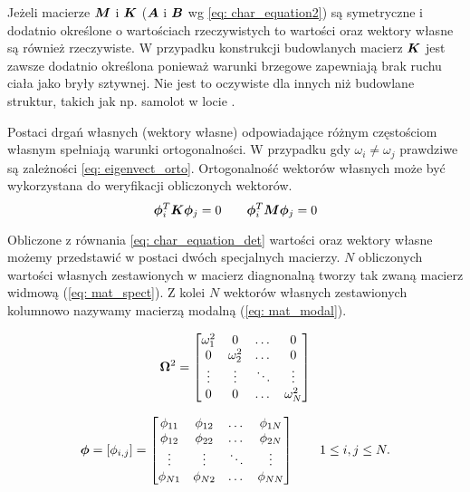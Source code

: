 Jeżeli macierze $\bm{M}$ i $\bm{K}$ ($\bm{A}$ i $\bm{B}$ wg \ref{eq: char_equation2}) są symetryczne i dodatnio określone o wartościach rzeczywistych to wartości oraz wektory własne są również rzeczywiste. W przypadku konstrukcji budowlanych macierz $\bm{K}$ jest zawsze dodatnio określona ponieważ warunki brzegowe zapewniają brak ruchu ciała jako bryły sztywnej. Nie jest to oczywiste dla innych niż budowlane struktur, takich jak np. samolot w locie \parencite{Chopra2012a}.


Postaci drgań własnych (wektory własne) odpowiadające różnym częstościom własnym spełniają warunki ortogonalności. W przypadku gdy $\omega_i \neq \omega_j$ prawdziwe są zależności \ref{eq: eigenvect_orto}. Ortogonalność wektorów własnych może być wykorzystana do weryfikacji obliczonych wektorów. 
\begin{equation} \label{eq: eigenvect_orto}
\bm{\phi}_i^{T}\bm{K\phi}_j = 0 \qquad \bm{\phi}_i^{T}\bm{M\phi}_j = 0
\end{equation}

Obliczone z równania \ref{eq: char_equation_det} wartości oraz wektory własne możemy przedstawić w postaci dwóch specjalnych macierzy. $N$ obliczonych wartości własnych zestawionych w macierz diagnonalną tworzy tak zwaną macierz widmową (\ref{eq: mat_spect}). Z kolei $N$ wektorów własnych zestawionych kolumnowo nazywamy macierzą modalną (\ref{eq: mat_modal}).

\begin{equation}  \label{eq: mat_spect}
\bm{\Omega}^2 =  
\begin{bmatrix} 
	\omega_{1}^2 & 0 			& \dots  & 0      \\ 
	0 		     & \omega_{2}^2 & \dots  & 0      \\
	\vdots       & \vdots       & \ddots & \vdots \\
	0 			 & 0 		    & \dots  & \omega_{N}^2 


\end{bmatrix}
\end{equation}

\begin{equation} \label{eq: mat_modal}
	\bm{\phi} = [\phi_{i,j}]= 
	\begin{bmatrix} 
		\phi_{11} & \phi_{12} & \dots & \phi_{1N} \\ 
		\phi_{12} & \phi_{22} & \dots & \phi_{2N} \\
		\vdots    & \vdots    & \ddots & \vdots \\
		\phi_{N1} & \phi_{N2} & \dots & \phi_{NN} 
	
	
	\end{bmatrix}
	\qquad
	1\leq i,j \leq N.
\end{equation}

